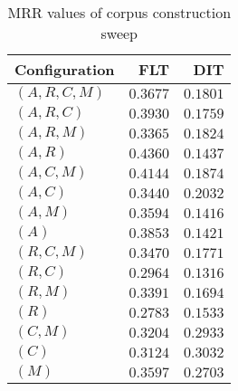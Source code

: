 
\begin{table}
\begin{spacing}{1.2}
\centering
\caption{MRR values of \pig corpus construction sweep}
\label{table:pig_corpus_sweep}
\vspace{0.2em}
\begin{tabular}{lrr}
\toprule
Configuration &           FLT &           DIT \\
\midrule
  $(A,R,C,M)$ &      $0.3677$ &      $0.1801$ \\
    $(A,R,C)$ &      $0.3930$ &      $0.1759$ \\
    $(A,R,M)$ &      $0.3365$ &      $0.1824$ \\
      $(A,R)$ & $\bm{0.4360}$ &      $0.1437$ \\
    $(A,C,M)$ &      $0.4144$ &      $0.1874$ \\
      $(A,C)$ &      $0.3440$ &      $0.2032$ \\
      $(A,M)$ &      $0.3594$ &      $0.1416$ \\
        $(A)$ &      $0.3853$ &      $0.1421$ \\
    $(R,C,M)$ &      $0.3470$ &      $0.1771$ \\
      $(R,C)$ &      $0.2964$ &      $0.1316$ \\
      $(R,M)$ &      $0.3391$ &      $0.1694$ \\
        $(R)$ &      $0.2783$ &      $0.1533$ \\
      $(C,M)$ &      $0.3204$ &      $0.2933$ \\
        $(C)$ &      $0.3124$ & $\bm{0.3032}$ \\
        $(M)$ &      $0.3597$ &      $0.2703$ \\
\bottomrule
\end{tabular}

\end{spacing}
\end{table}

